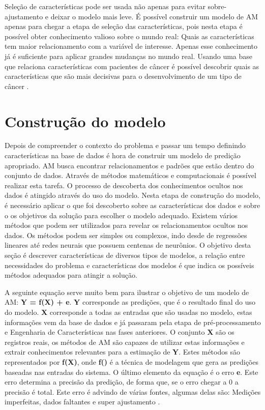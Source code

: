 Seleção de características pode ser usada não apenas para evitar sobre-ajustamento e deixar o modelo mais leve. É possível construir um modelo de AM apenas para chegar a etapa de seleção das características, pois nesta etapa é possível obter conhecimento valioso sobre o mundo real: Quais as características tem maior relacionamento com a variável de interesse. Apenas esse conhecimento já é suficiente para aplicar grandes mudanças no mundo real. Usando uma base que relaciona características com pacientes de câncer é possível descobrir quais as características que são mais decisivas para o desenvolvimento de um tipo de câncer \cite{real2013}.

\section{Construção do modelo}
Depois de compreender o contexto do problema e passar um tempo definindo características na base de dados é hora de construir um modelo de predição apropriado. AM busca encontrar relacionamentos e padrões que estão dentro do conjunto de dados. Através de métodos matemáticos e computacionais é possível realizar esta tarefa. O processo de descoberta dos conhecimentos ocultos nos dados é atingido através do uso do modelo. Nesta etapa de construção do modelo, é necessário aplicar o que foi descoberto sobre as características dos dados e sobre o os objetivos da solução para escolher o modelo adequado. Existem vários métodos que podem ser utilizados para revelar os relacionamentos ocultos nos dados. Os métodos podem ser simples ou complexos, indo desde de regressões lineares até redes neurais que possuem centenas de neurônios. O objetivo desta seção é descrever características de diversos tipos de modelos, a relação entre necessidades do problema e características dos modelos é que indica os possíveis métodos adequados para atingir a solução. 

A seguinte equação serve muito bem para ilustrar o objetivo de um modelo de AM: \textbf{ Y = f(X) + e}. \textbf{Y} corresponde as predições, que é o resultado final do uso do modelo. \textbf{X} corresponde a todas as entradas que são usadas no modelo, estas informações vem da base de dados e já passaram pela etapa de pré-processamento e Engenharia de Características nas fases anteriores. O conjunto \textbf{X} são os registros reais, os métodos de AM são capazes de utilizar estas informações e extrair conhecimentos relevantes para a estimação de \textbf{Y}. Estes  métodos são representados por \textbf{f(X)}, onde \textbf{f()} é a técnica de modelagem que gera as predições baseadas nas entradas do sistema. O último elemento da equação é o erro \textbf{e}. Este erro determina a precisão da predição, de forma que, se o erro chegar a 0 a precisão é total. Este erro é advindo de várias fontes, algumas delas são: Medições imperfeitas, dados faltantes e super ajustamento \cite{real2013}.

